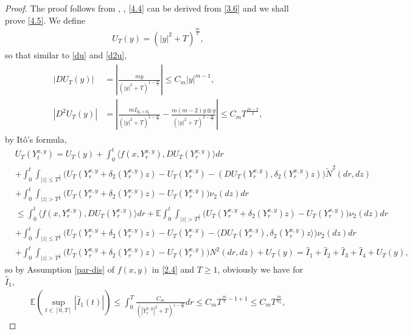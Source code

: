 \documentclass[11pt,reqno]{amsart}
\numberwithin{equation}{section}
\begin{document}
\begin{proof}
The proof follows from \cite[Lemma A.1]{SXX}, \cite[Theorem 4.1]{KY},	\eqref{4.4} can be derived from \eqref{3.6} and we shall prove \eqref{4.5}.
	We define 
	\begin{align*}
		U_{T}(y)=(|y|^{2}+T)^{\frac{m}{2}},
	\end{align*}
	so that similar to \eqref{du} and \eqref{d2u},
	\begin{align*}
		\begin{split}
				|DU_{T}(y)|&=\left|  \frac{my}{(|y|^{2}+T)^{1-\frac{m}{2}}}\right|\leq C_{m} |y|^{m-1},\\
		|D^{2}U_{T}(y)|&=\left|   \frac{mI_{d_{2}\times d_{2} }}{(|y|^{2}+T)^{1-\frac{m}{2}}}-\frac{m(m-2)y\otimes y}{(|y|^{2}+T)^{2-\frac{m}{2}}} \right|\leq C_{m}T^{\frac{m-2}{2}},
		\end{split}
	\end{align*}
by It\^{o}'s formula,
	\begin{align*}
			&U_{T}(Y_{t}^{ x,y})=U_{T}(y)+ \int_{0}^{t} \langle f(x,Y_{r}^{ x,y}),DU_{T}(Y_{r}^{x,y})\rangle  dr \\
			&+ \int_{0}^{t}\int_{|z|\leq T^{\frac{1}{2}}}\Big( U_{T}(Y_{r}^{ x,y}+\delta_{2}(Y_{r}^{ x,y})z)-U_{T}(Y_{r}^{ x,y})-(DU_{T}(Y_{r}^{ x,y}), \delta_{2}(Y_{r}^{ x,y})z)  \Big) \tilde{N}^{2}(dr,dz)\\
			&+\int_{0}^{t} \int_{|z|> T^{\frac{1}{2}}}\Big( U_{T}(Y_{r}^{x,y}+\delta_{2}(Y_{r}^{ x,y})z)-U_{T}(Y_{r}^{ x,y}) \Big) \nu_{2}(dz)dr\\
			&\leq  \int_{0}^{t} \langle f(x,Y_{r}^{x,y}),DU_{T}(Y_{r}^{ x,y})\rangle  dr+\mathbb{E} \int_{0}^{t}\int_{|z|> T^{\frac{1}{2}}}\Big( U_{T}(Y_{r}^{x,y}+\delta_{2}(Y_{r}^{ x,y})z)-U_{T}(Y_{r}^{ x,y}) \Big) \nu_{2}(dz)dr\\
			&+\int_{0}^{t} \int_{|z|\leq T^{\frac{1}{2}}}\Big( U_{T}(Y_{r}^{x,y}+\delta_{2}(Y_{r}^{ x,y})z)-U_{T}(Y_{r}^{ x,y})- \langle DU_{T}(Y_{r}^{x,y}), \delta_{2}(Y_{r}^{ x,y})z\rangle \Big) \nu_{2}(dz)dr\\
			&+\int_{0}^{t} \int_{|z|> T^{\frac{1}{2}}}\Big( U_{T}(Y_{r}^{x,y}+\delta_{2}(Y_{r}^{ x,y})z)-U_{T}(Y_{r}^{ x,y}) \Big) N^{2}(dr,dz)+U_{T}(y)=\hat{I}_{1}+\hat{I}_{2}+\hat{I}_{3}+\hat{I}_{4}+U_{T}(y),
	\end{align*}
	so by Assumption \ref{par-dis} of $f(x,y)$ in  \eqref{2.4} and $T\geq 1$, obviously we have for $\hat{I}_{1}$,
	\begin{align*}
		\mathbb{E}\left(\sup_{t\in [0,T]} |\hat{I}_{1}(t)|\right)\leq \int_{0}^{T} \frac{C_{m}}{(|Y_{r}^{ x,y}|^{2}+T)^{1-\frac{m}{2}}}dr\leq C_{m}T^{\frac{m}{2}-1+1}\leq C_{m}T^{\frac{m}{\alpha_{2}}},

\end{align*}
\end{proof}
\end{document}
